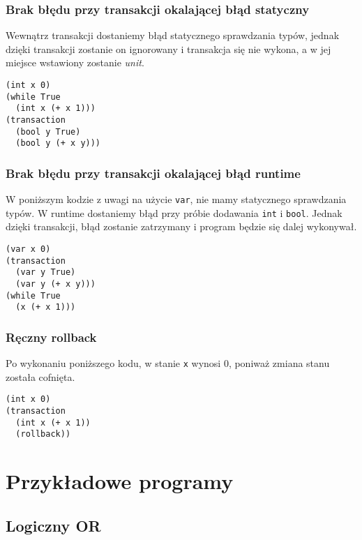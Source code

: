 \documentclass{article}
\begin{document}
\subsubsection{Brak błędu przy transakcji okalającej błąd statyczny}

Wewnątrz transakcji dostaniemy błąd statycznego sprawdzania typów, jednak dzięki transakcji zostanie on ignorowany i transakcja się nie wykona, a w jej miejsce wstawiony zostanie \textit{unit}.

\begin{lstlisting}
(int x 0)
(while True
  (int x (+ x 1)))
(transaction
  (bool y True)
  (bool y (+ x y)))
\end{lstlisting}

\subsubsection{Brak błędu przy transakcji okalającej błąd runtime}

W poniższym kodzie z uwagi na użycie \texttt{var}, nie mamy statycznego sprawdzania typów. W runtime dostaniemy błąd przy próbie dodawania \texttt{int} i \texttt{bool}. Jednak dzięki transakcji, błąd zostanie zatrzymany i program będzie się dalej wykonywał.

\begin{lstlisting}
(var x 0)
(transaction
  (var y True)
  (var y (+ x y)))
(while True
  (x (+ x 1)))
\end{lstlisting}

\subsubsection{Ręczny rollback}

Po wykonaniu poniższego kodu, w stanie \texttt{x} wynosi 0, poniważ zmiana stanu została cofnięta.

\begin{lstlisting}
(int x 0)
(transaction
  (int x (+ x 1))
  (rollback))
\end{lstlisting}

\pagebreak

\section{Przykładowe programy}

\subsection{Logiczny OR}
\end{document}
